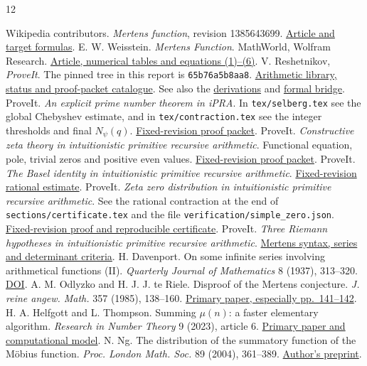 \begin{thebibliography}{12}\raggedright
{} Wikipedia contributors. \emph{Mertens function}, revision 1385643699. \href{https://en.wikipedia.org/w/index.php?title=Mertens_function&oldid=1385643699}{Article and target formulas}.
 E. W. Weisstein. \emph{Mertens Function}. MathWorld, Wolfram Research. \href{https://mathworld.wolfram.com/MertensFunction.html}{Article, numerical tables and equations (1)--(6)}.
 V. Reshetnikov, \emph{ProveIt}. The pinned tree in this report is \texttt{65b76a5b8aa8}. \href{\proj}{Arithmetic library, status and proof-packet catalogue}. See also the \href{\proj/Derivations}{derivations} and \href{\proj/Bridge}{formal bridge}.
 ProveIt. \emph{An explicit prime number theorem in iPRA}. In \texttt{tex/selberg.tex} see the global Chebyshev estimate, and in \texttt{tex/contraction.tex} see the integer thresholds and final $N_\psi(q)$. \href{\proj/docs/proofs/analytic-number-theory/pnt_ipra_constructive_2026-11-14}{Fixed-revision proof packet}.
 ProveIt. \emph{Constructive zeta theory in intuitionistic primitive recursive arithmetic}. Functional equation, pole, trivial zeros and positive even values. \href{\proj/docs/proofs/analytic-number-theory/zeta_ipra_proof_package}{Fixed-revision proof packet}.
 ProveIt. \emph{The Basel identity in intuitionistic primitive recursive arithmetic}. \href{\proj/docs/proofs/analysis/basel_ipra}{Fixed-revision rational estimate}.
 ProveIt. \emph{Zeta zero distribution in intuitionistic primitive recursive arithmetic}. See the rational contraction at the end of \texttt{sections/certificate.tex} and the file \texttt{verification/simple\_zero.json}. \href{\proj/docs/proofs/analytic-number-theory/zeta_zeros_ipra_2026-11-15}{Fixed-revision proof and reproducible certificate}.
 ProveIt. \emph{Three Riemann hypotheses in intuitionistic primitive recursive arithmetic}. \href{\proj/docs/proofs/analytic-number-theory/riemann_ipra_equivalences_2026-11-20}{Mertens syntax, series and determinant criteria}.
 H. Davenport. On some infinite series involving arithmetical functions (II). \emph{Quarterly Journal of Mathematics} 8 (1937), 313--320. \href{https://doi.org/10.1093/qmath/os-8.1.313}{DOI}.
 A. M. Odlyzko and H. J. J. te Riele. Disproof of the Mertens conjecture. \emph{J. reine angew. Math.} 357 (1985), 138--160. \href{https://ir.cwi.nl/pub/1823/1823D.pdf}{Primary paper, especially pp.~141--142}.
 H. A. Helfgott and L. Thompson. Summing $\mu(n)$: a faster elementary algorithm. \emph{Research in Number Theory} 9 (2023), article 6. \href{https://doi.org/10.1007/s40993-022-00408-8}{Primary paper and computational model}.
 N. Ng. The distribution of the summatory function of the M\"obius function. \emph{Proc. London Math. Soc.} 89 (2004), 361--389. \href{https://arxiv.org/abs/math/0310381}{Author's preprint}.
\end{thebibliography}
